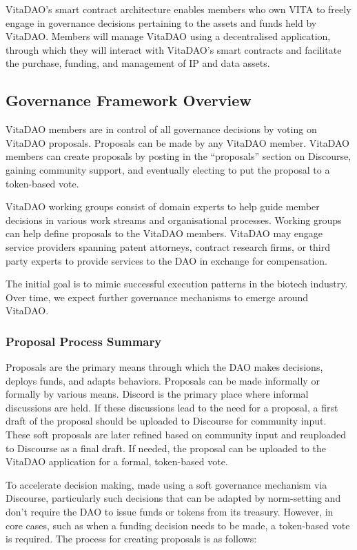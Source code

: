 \documentclass[12pt,letterpaper]{article}
\begin{document}
VitaDAO’s smart contract architecture enables members who own VITA to freely engage in governance decisions pertaining to the assets and funds held by VitaDAO. Members will manage VitaDAO using a decentralised application, through which they will interact with VitaDAO’s smart contracts and facilitate the purchase, funding, and management of IP and data assets.

\subsection{Governance Framework Overview}
VitaDAO members are in control of all governance decisions by voting on VitaDAO proposals. Proposals can be made by any VitaDAO member. VitaDAO members can create proposals by posting in the “proposals” section on Discourse, gaining community support, and eventually electing to put the proposal to a token-based vote. 

VitaDAO working groups consist of domain experts to help guide member decisions in various work streams and organisational processes. Working groups can help define proposals to the VitaDAO members. VitaDAO may engage service providers spanning patent attorneys, contract research firms, or third party experts to provide services to the DAO in exchange for compensation.

The initial goal is to mimic successful execution patterns in the biotech industry. Over time, we expect further governance mechanisms to emerge around VitaDAO.

\subsubsection{Proposal Process Summary}
Proposals are the primary means through which the DAO makes decisions, deploys funds, and adapts behaviors. Proposals can be made informally or formally by various means. Discord is the primary place where informal discussions are held. If these discussions lead to the need for a proposal, a first draft of the proposal should be uploaded to Discourse for community input. These soft proposals are later refined based on community input and reuploaded to Discourse as a final draft. If needed, the proposal can be uploaded to the VitaDAO application for a formal, token-based vote. 

To accelerate decision making, made using a soft governance mechanism via Discourse, particularly such decisions that can be adapted by norm-setting and don’t require the DAO to issue funds or tokens from its treasury. However, in core cases, such as when a funding decision needs to be made, a token-based vote is required. The process for creating proposals is as follows:
\end{document}
